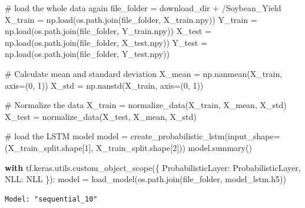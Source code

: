 \documentclass[
  letterpaper,
  DIV=11,
  numbers=noendperiod]{scrreprt}
\newenvironment{Shaded}{\begin{snugshade}}{\end{snugshade}}
\newcommand{\CommentTok}[1]{\textcolor[rgb]{0.37,0.37,0.37}{#1}}
\newcommand{\ControlFlowTok}[1]{\textcolor[rgb]{0.00,0.23,0.31}{\textbf{#1}}}
\newcommand{\DecValTok}[1]{\textcolor[rgb]{0.68,0.00,0.00}{#1}}
\newcommand{\NormalTok}[1]{\textcolor[rgb]{0.00,0.23,0.31}{#1}}
\newcommand{\OperatorTok}[1]{\textcolor[rgb]{0.37,0.37,0.37}{#1}}
\newcommand{\StringTok}[1]{\textcolor[rgb]{0.13,0.47,0.30}{#1}}
\begin{document}
\begin{Shaded}
\begin{Highlighting}[]
\CommentTok{\# load the whole data again}
\NormalTok{file\_folder }\OperatorTok{=}\NormalTok{ download\_dir }\OperatorTok{+} \StringTok{\textquotesingle{}/Soybean\_Yield\textquotesingle{}}
\NormalTok{X\_train }\OperatorTok{=}\NormalTok{ np.load(os.path.join(file\_folder, }\StringTok{\textquotesingle{}X\_train.npy\textquotesingle{}}\NormalTok{))}
\NormalTok{Y\_train }\OperatorTok{=}\NormalTok{ np.load(os.path.join(file\_folder, }\StringTok{\textquotesingle{}Y\_train.npy\textquotesingle{}}\NormalTok{))}
\NormalTok{X\_test }\OperatorTok{=}\NormalTok{ np.load(os.path.join(file\_folder, }\StringTok{\textquotesingle{}X\_test.npy\textquotesingle{}}\NormalTok{))}
\NormalTok{Y\_test }\OperatorTok{=}\NormalTok{ np.load(os.path.join(file\_folder, }\StringTok{\textquotesingle{}Y\_test.npy\textquotesingle{}}\NormalTok{))}

\CommentTok{\# Calculate mean and standard deviation}
\NormalTok{X\_mean }\OperatorTok{=}\NormalTok{ np.nanmean(X\_train, axis}\OperatorTok{=}\NormalTok{(}\DecValTok{0}\NormalTok{, }\DecValTok{1}\NormalTok{))}
\NormalTok{X\_std }\OperatorTok{=}\NormalTok{ np.nanstd(X\_train, axis}\OperatorTok{=}\NormalTok{(}\DecValTok{0}\NormalTok{, }\DecValTok{1}\NormalTok{))}

\CommentTok{\# Normalize the data}
\NormalTok{X\_train }\OperatorTok{=}\NormalTok{ normalize\_data(X\_train, X\_mean, X\_std)}
\NormalTok{X\_test }\OperatorTok{=}\NormalTok{ normalize\_data(X\_test, X\_mean, X\_std)}

\CommentTok{\# load the LSTM model}
\NormalTok{model }\OperatorTok{=}\NormalTok{ create\_probabilistic\_lstm(input\_shape}\OperatorTok{=}\NormalTok{(X\_train\_split.shape[}\DecValTok{1}\NormalTok{], X\_train\_split.shape[}\DecValTok{2}\NormalTok{]))}
\NormalTok{model.summary()}

\ControlFlowTok{with}\NormalTok{ tf.keras.utils.custom\_object\_scope(\{}
    \StringTok{\textquotesingle{}ProbabilisticLayer\textquotesingle{}}\NormalTok{: ProbabilisticLayer,}
    \StringTok{\textquotesingle{}NLL\textquotesingle{}}\NormalTok{: NLL}
\NormalTok{\}):}
\NormalTok{    model }\OperatorTok{=}\NormalTok{ load\_model(os.path.join(file\_folder, }\StringTok{\textquotesingle{}model\_lstm.h5\textquotesingle{}}\NormalTok{))}
\end{Highlighting}
\end{Shaded}

\begin{verbatim}
Model: "sequential_10"
\end{verbatim}
\end{document}
